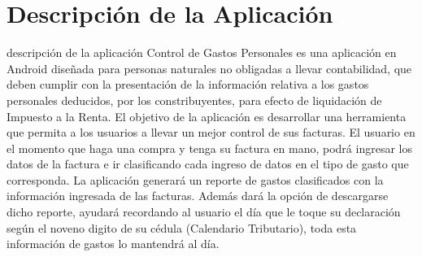 \documentclass[utf8]{beamer}
\begin{document}
\section{Descripción de la Aplicación}
\begin{frame}[allowframebreaks]
\begin{block}{descripción de la aplicación}
Control de Gastos Personales es una aplicación en Android  diseñada para  personas naturales no obligadas a llevar contabilidad, que deben cumplir con la presentación de la información relativa a los gastos personales deducidos, por los constribuyentes, para efecto de liquidación de Impuesto a la Renta.
El objetivo de la aplicación  es desarrollar una herramienta que permita a los usuarios a llevar un mejor control de sus facturas. El usuario en el momento que haga una compra y tenga su factura en mano, podrá ingresar los datos de la factura e ir clasificando cada ingreso de datos en el tipo de gasto que corresponda.
La aplicación generará un reporte de gastos clasificados con la información ingresada de las facturas. Además dará la opción de descargarse dicho reporte, ayudará  recordando al usuario el día que le toque su declaración según el noveno digito de su cédula (Calendario Tributario), toda esta información de gastos lo mantendrá al día.
\end {block}
\end{frame}
\end{document}
